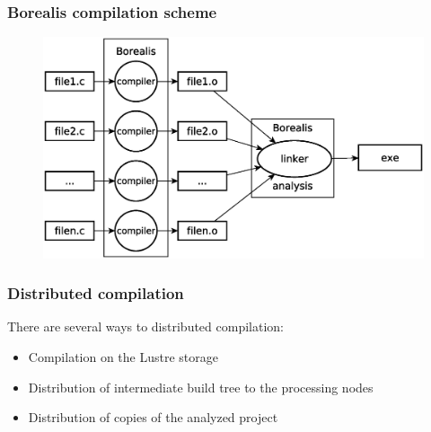 

\begin{frame}
\frametitle{Borealis compilation scheme}
	\begin{figure}
		\includegraphics[width=115mm]{image/compile}
	\end{figure}	
\end{frame}



\begin{frame}
\frametitle{Distributed compilation}
There are several ways to distributed compilation:
\begin{itemize}
	\item Compilation on the Lustre storage
	\item Distribution of intermediate build tree to the processing nodes
	\item Distribution of copies of the analyzed project
\end{itemize} 
\end{frame}


